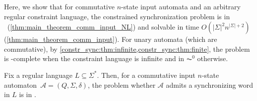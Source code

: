 
Here, we show that for commutative $n$-state input automata
and an arbitrary regular constraint language,
the constrained synchronization problem is in \NL\ (\cref{thm:main_theorem_comm_input_NL})
and solvable in time $O(|\Sigma|^2n^{|\Sigma|+2})$ (\cref{thm:main_theorem_comm_input}).
For unary automata (which are commutative),
by \cref{constr_sync:thm:infinite,constr_sync:thm:finite},
the problem is \LOGSPACE-complete
when the constraint language is infinite and in $\AC^0$ otherwise.

\begin{theorem}
\label{thm:main_theorem_comm_input_NL}
 Fix a regular language $L \subseteq \Sigma^*$.
 Then, for a commutative input $n$-state automaton~$\mathcal A = (Q, \Sigma, \delta)$,
 the problem whether $\mathcal A$ admits a synchronizing
 word in $L$ is in \NL.
\end{theorem}
